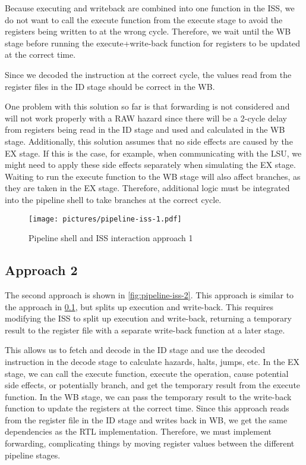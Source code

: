 Because executing and writeback are combined into one function in the ISS, we do not want to call the execute function from the execute stage to avoid the registers being written to at the wrong cycle. Therefore, we wait until the WB stage before running the execute+write-back function for registers to be updated at the correct time. 

Since we decoded the instruction at the correct cycle, the values read from the register files in the ID stage should be correct in the WB. 

One problem with this solution so far is that forwarding is not considered and will not work properly with a RAW hazard since there will be a 2-cycle delay from registers being read in the ID stage and used and calculated in the WB stage.
Additionally, this solution assumes that no side effects are caused by the EX stage. If this is the case, for example, when communicating with the LSU, we might need to apply these side effects separately when simulating the EX stage.
Waiting to run the execute function to the WB stage will also affect branches, as they are taken in the EX stage. Therefore, additional logic must be integrated into the pipeline shell to take branches at the correct cycle. 

\begin{figure}[ht]
    \centering
    \texttt{[image: pictures/pipeline-iss-1.pdf]}
    \caption{Pipeline shell and ISS interaction approach 1}
    \label{fig:pipeline-iss-1}
\end{figure}

\subsection{Approach 2}
\label{sec:app2}

The second approach is shown in \cref{fig:pipeline-iss-2}. This approach is similar to the approach in \cref{sec:app2}, but splits up execution and write-back.
This requires modifying the ISS to split up execution and write-back, returning a temporary result to the register file with a separate write-back function at a later stage.

This allows us to fetch and decode in the ID stage and use the decoded instruction in the decode stage to calculate hazards, halts, jumps, etc. In the EX stage, we can call the execute function, execute the operation, cause potential side effects, or potentially branch, and get the temporary result from the execute function. In the WB stage, we can pass the temporary result to the write-back function to update the registers at the correct time.
Since this approach reads from the register file in the ID stage and writes back in WB, we get the same dependencies as the RTL implementation. Therefore, we must implement forwarding, complicating things by moving register values between the different pipeline stages.


